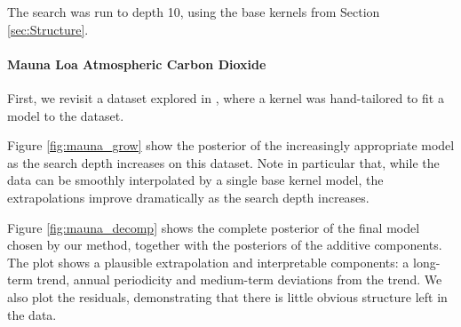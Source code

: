 \documentclass[twoside]{article}
\begin{document}

The search was run to depth 10, using the base kernels from Section \ref{sec:Structure}.




\label{sec:extrapolation}
\paragraph{Mauna Loa Atmospheric Carbon Dioxide}

First, we revisit a dataset explored in \mbox{\cite{rasmussen38gaussian}}%
, where a kernel was hand-tailored to fit a \gp{} model to the dataset.

Figure \ref{fig:mauna_grow} show the posterior of the increasingly appropriate model as the search depth increases on this dataset.
Note in particular that, while the data can be smoothly interpolated by a single base kernel model, the extrapolations improve dramatically as the search depth increases.

Figure \ref{fig:mauna_decomp} shows the complete posterior of the final model chosen by our method, together with the posteriors of the additive components.
The plot shows a plausible extrapolation and interpretable components: a long-term trend, annual periodicity and medium-term deviations from the trend.
We also plot the residuals, demonstrating that there is little obvious structure left in the data.
\end{document}
